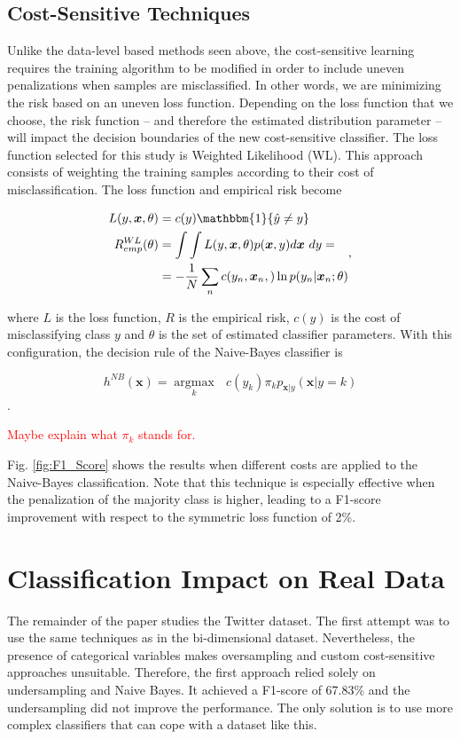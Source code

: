 \documentclass[conference]{IEEEtran}
\begin{document}
	\subsection{Cost-Sensitive Techniques}
	Unlike the data-level based methods seen above, the cost-sensitive learning requires the training algorithm to be modified in order to include uneven penalizations when samples are misclassified. In other words, we are minimizing the risk based on an uneven loss function. Depending on the loss function that we choose, the risk function -- and therefore the estimated distribution parameter -- will impact the decision boundaries of the new cost-sensitive classifier. The loss function selected for this study is Weighted Likelihood (WL). This approach consists of weighting the training samples according to their cost of misclassification. The loss function and empirical risk become
	
	\begin{equation*}
	\begin{aligned} \label{costWL}
			L(y,\boldsymbol x, \theta) &= c(y)\mathbbm{1}\{ \hat y \neq y \} \\
			R^{WL}_{emp}(\theta) &= \int \int L(y,\boldsymbol x, \theta) p(\boldsymbol x, y) d\boldsymbol x \text{ }dy=\\
				      &=-\frac{1}{N} \sum_n c(y_n,\boldsymbol x_n,) \ln p(y_n | \boldsymbol x_n;\theta)
		\end{aligned},
	\end{equation*}
	
	where $L$ is the loss function, $R$ is the empirical risk, $c(y)$ is the cost of misclassifying class $y$ and $\theta$ is the set of estimated classifier parameters. With this configuration, the decision rule of the Naive-Bayes classifier is
	
	$$ h^{NB}(\boldsymbol x) = \underset{k}{\operatorname{argmax}} \text{ } c(y_k) \pi_k p_{\boldsymbol x | y}(\boldsymbol x|y=k)$$.

\textcolor{red}{Maybe explain what $\pi_k$ stands for.}
	
	Fig. \ref{fig:F1_Score} shows the results when different costs are applied to the Naive-Bayes classification. Note that this technique is especially effective when the penalization of the majority class is higher, leading to a F1-score improvement with respect to the symmetric loss function of 2\%.
	
\section{Classification Impact on Real Data}
The remainder of the paper studies the Twitter dataset. The first attempt was to use the same techniques as in the bi-dimensional dataset. Nevertheless, the presence of categorical variables makes oversampling and custom cost-sensitive approaches unsuitable. Therefore, the first approach relied solely on undersampling and Naive Bayes. It achieved a F1-score of 67.83\% and the undersampling did not improve the performance. The only solution is to use more complex classifiers that can cope with a dataset like this.
\end{document}
